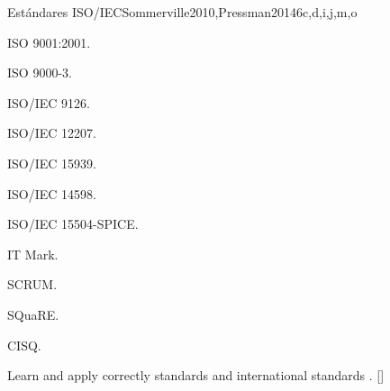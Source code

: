 \begin{syllabus}
\begin{unit}{Estándares ISO/IEC}{}{Sommerville2010,Pressman2014}{6}{c,d,i,j,m,o}
\begin{topics}
    \item ISO 9001:2001.
    \item ISO 9000-3.
    \item ISO/IEC 9126.
    \item ISO/IEC 12207.
    \item ISO/IEC 15939.
    \item ISO/IEC 14598.
    \item ISO/IEC 15504-SPICE.
    \item IT Mark.
    \item SCRUM.
    \item SQuaRE.
    \item CISQ.
\end{topics}
\begin{learningoutcomes}%
    \item Learn and apply correctly standards and international standards . [\Usage]
\end{learningoutcomes}
\end{unit}

\begin{coursebibliography}
\end{coursebibliography}

\end{syllabus}
